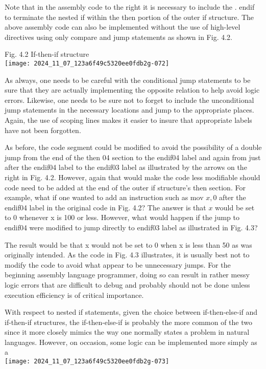 \documentclass[10pt]{article}
\begin{document}
Note that in the assembly code to the right it is necessary to include the . endif to terminate the nested if within the then portion of the outer if structure. The above assembly code can also be implemented without the use of high-level directives using only compare and jump statements as shown in Fig. 4.2.

Fig. 4.2 If-then-if structure\\
\texttt{[image: 2024\_11\_07\_123a6f49c5320ee0fdb2g-072]}

As always, one needs to be careful with the conditional jump statements to be sure that they are actually implementing the opposite relation to help avoid logic errors. Likewise, one needs to be sure not to forget to include the unconditional jump statements in the necessary locations and jump to the appropriate places. Again, the use of scoping lines makes it easier to insure that appropriate labels have not been forgotten.

As before, the code segment could be modified to avoid the possibility of a double jump from the end of the then 04 section to the endif04 label and again from just after the endif04 label to the endif03 label as illustrated by the arrows on the right in Fig. 4.2. However, again that would make the code less modifiable should code need to be added at the end of the outer if structure's then section. For example, what if one wanted to add an instruction such as mov $x, 0$ after the endif04 label in the original code in Fig. 4.2? The answer is that $x$ would be set to 0 whenever x is 100 or less. However, what would happen if the jump to endif04 were modified to jump directly to endif03 label as illustrated in Fig. 4.3?

The result would be that x would not be set to 0 when x is less than 50 as was originally intended. As the code in Fig. 4.3 illustrates, it is usually best not to modify the code to avoid what appear to be unnecessary jumps. For the beginning assembly language programmer, doing so can result in rather messy logic errors that are difficult to debug and probably should not be done unless execution efficiency is of critical importance.

With respect to nested if statements, given the choice between if-then-else-if and if-then-if structures, the if-then-else-if is probably the more common of the two since it more closely mimics the way one normally states a problem in natural languages. However, on occasion, some logic can be implemented more simply as a\\
\texttt{[image: 2024\_11\_07\_123a6f49c5320ee0fdb2g-073]}
\end{document}

